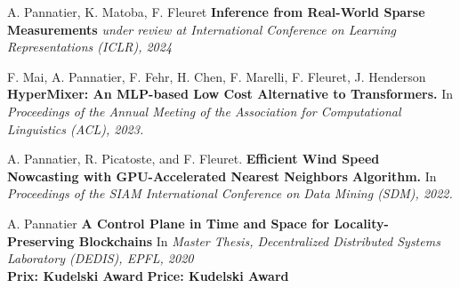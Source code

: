 \small
A. Pannatier, K. Matoba, F. Fleuret \textbf{Inference from Real-World Sparse Measurements} \textit{under review at International Conference on Learning Representations (ICLR), 2024}
\commonvspace

F. Mai, A. Pannatier, F. Fehr, H. Chen, F. Marelli, F. Fleuret, J. Henderson \textbf{HyperMixer: An MLP-based Low Cost Alternative to Transformers.} In \textit{Proceedings of the Annual Meeting of the Association for Computational Linguistics (ACL), 2023.}
\commonvspace

A. Pannatier, R. Picatoste, and F. Fleuret. \textbf{Efficient Wind Speed Nowcasting with GPU-Accelerated Nearest Neighbors Algorithm.} In \textit{Proceedings of the SIAM International Conference on Data Mining (SDM), 2022.}
\commonvspace

A. Pannatier \textbf{A Control Plane in Time and Space for Locality-Preserving Blockchains} In \textit{Master Thesis, Decentralized Distributed Systems Laboratory (DEDIS), EPFL, 2020} \\
\ifFrench
  \textbf{Prix: Kudelski Award}
\else
  \textbf{Price: Kudelski Award}
\fi
\commonvspace